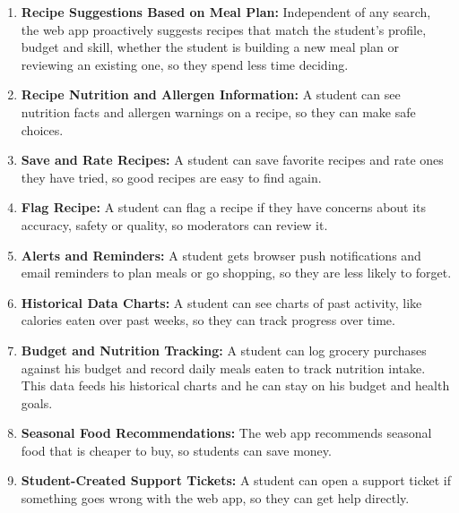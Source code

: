 \documentclass[10pt,letterpaper]{article}
\begin{document}
\begin{enumerate}[leftmargin=1.7em]
  \item \textbf{Recipe Suggestions Based on Meal Plan:} Independent of any search, the web app proactively suggests recipes that match the student's profile, budget and skill, whether the student is building a new meal plan or reviewing an existing one, so they spend less time deciding.
  \item \textbf{Recipe Nutrition and Allergen Information:} A student can see nutrition facts and allergen warnings on a recipe, so they can make safe choices.
  \item \textbf{Save and Rate Recipes:} A student can save favorite recipes and rate ones they have tried, so good recipes are easy to find again.
  \item \textbf{Flag Recipe:} A student can flag a recipe if they have concerns about its accuracy, safety or quality, so moderators can review it.
  \item \textbf{Alerts and Reminders:} A student gets browser push notifications and email reminders to plan meals or go shopping, so they are less likely to forget.
  \item \textbf{Historical Data Charts:} A student can see charts of past activity, like calories eaten over past weeks, so they can track progress over time.
  \item \textbf{Budget and Nutrition Tracking:} A student can log grocery purchases against his budget and record daily meals eaten to track nutrition intake. This data feeds his historical charts and he can stay on his budget and health goals.
  \item \textbf{Seasonal Food Recommendations:} The web app recommends seasonal food that is cheaper to buy, so students can save money.
  \item \textbf{Student-Created Support Tickets:} A student can open a support ticket if something goes wrong with the web app, so they can get help directly.
\end{enumerate}
\end{document}
